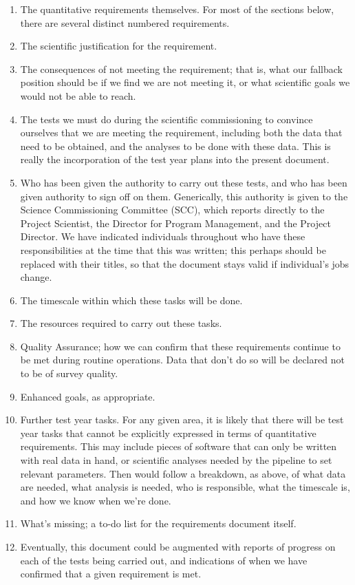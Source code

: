 \begin{enumerate} 
\item The quantitative requirements themselves.  For most of the
sections below, there are several distinct numbered requirements. 
\item The scientific justification for the requirement.
\item The consequences of not meeting the requirement; that is, what
our fallback position should be if we find we are not meeting it, or
what scientific goals we would not be able to reach. 
\item The tests we must do during the scientific commissioning to
convince ourselves that we are meeting the requirement, including both
the data that need to be obtained, and the analyses to be done with
these data.  This is really the incorporation of the test year plans
into the present document.
\item Who has been given the authority to carry out these tests, and
who has been given authority to sign off on them.  Generically, this
authority is given to the Science Commissioning Committee (SCC), which
reports directly to the Project Scientist, the Director for Program
Management, and the Project Director.  We have indicated individuals
throughout who have these responsibilities at the time that this was
written; this perhaps should be replaced with their titles, so that
the document stays valid if individual's jobs change. 
\item The timescale within which these tasks will be done. 
\item The resources required to carry out these tasks. 
\item Quality Assurance; how we can confirm that these requirements
continue to be met during routine operations.  Data that don't do so
will be declared not to be of survey quality. 
\item Enhanced goals, as appropriate.
\item Further test year tasks.  For any given area, it is likely that
there will be test year tasks 
that cannot be explicitly expressed in terms of quantitative
requirements.  This may include pieces of software that can only be
written with real data in hand, or scientific analyses needed by the
pipeline to set relevant parameters.  Then would follow a
breakdown, as above, of what data are needed, what analysis is needed,
who is responsible, what the timescale is, and how we know when we're
done. 
\item What's missing; a to-do list for the requirements document itself.
\item Eventually, this document could be augmented with reports of
progress on each of the tests being carried out, and indications of
when we have confirmed that a given requirement is met. 
\end{enumerate}

